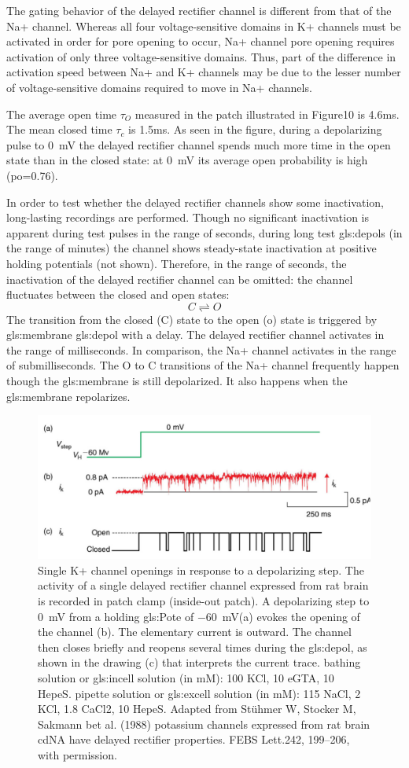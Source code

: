 \documentclass[../../Orator]{subfiles}
\begin{document}
The gating behavior of the delayed rectifier channel is different from that of the Na+ channel.  Whereas all four voltage-sensitive domains in K+ channels must be activated in order for pore opening to occur, Na+ channel pore opening requires activation of only three voltage-sensitive domains. Thus, part of the difference in activation speed between Na+ and K+ channels may be due to the lesser number of voltage-sensitive domains required to move in Na+ channels.

The average open time \(\tau_O\) measured in the patch illustrated in Figure10 is 4.6ms. The mean closed time \(\tau_c\) is 1.5ms. As seen in the figure, during a depolarizing pulse to \qty{0}{\mV} the delayed rectifier channel spends much more time in the open state than in the closed state: at \qty{0}{\mV} its average open probability is high (po=0.76).

In order to test whether the delayed rectifier channels show some inactivation, long-lasting recordings are performed. Though no significant inactivation is apparent during test pulses in the range of seconds, during long test \glspl{gls:depol} (in the range of minutes) the channel shows steady-state inactivation at positive holding potentials (not shown). Therefore, in the range of seconds, the inactivation of the delayed rectifier channel can be omitted: the channel fluctuates between the closed and open states:
\[C\rightleftharpoons O\]
The transition from the closed (C) state to the open (o) state is triggered by \gls{gls:membrane} \gls{gls:depol} with a delay. The delayed rectifier channel activates in the range of milliseconds. In comparison, the Na+ channel activates in the range of submilliseconds. The O to C transitions of the Na+ channel frequently happen though the \gls{gls:membrane} is still depolarized. It also happens when the \gls{gls:membrane} repolarizes. 
  \begin{figure}[H]
      \centering
      \includegraphics[width=0.5\linewidth]{Pictures//Anakin/K+channel.png}
      \caption{Single K+ channel openings in response to a depolarizing step. The activity of a single delayed rectifier channel expressed from rat brain is recorded in patch clamp (inside-out patch). A depolarizing step to \qty{0}{\mV} from a holding \gls{gls:Pote} of \qty{-60}{\mV}(a) evokes the opening of the channel (b). The elementary current is outward. The channel then closes briefly and reopens several times during the \gls{gls:depol}, as shown in the drawing (c) that interprets the current trace. bathing solution or \gls{gls:incell} solution (in mM): 100 KCl, 10 eGTA, 10 HepeS. pipette solution or \gls{gls:excell} solution (in mM): 115 NaCl, 2 KCl, 1.8 CaCl2, 10 HepeS. Adapted from Stühmer W, Stocker M, Sakmann bet al. (1988) potassium channels expressed from rat brain cdNA have delayed rectifier properties. FEBS Lett.242, 199–206, with permission. }
      \label{fig:enter-label}
  \end{figure}
\end{document}
